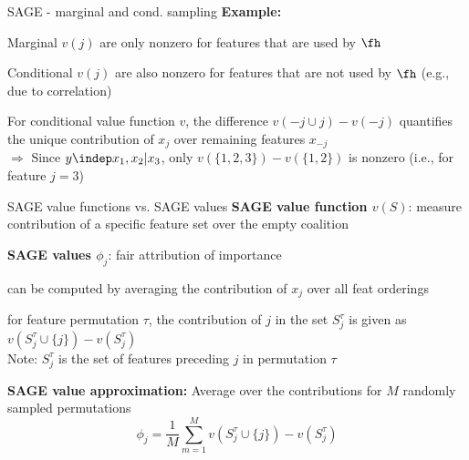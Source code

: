 \documentclass[10pt,compress,t,notes=noshow, xcolor=table]{beamer}
\newcommand{\Stau}{S_{j}^\tau}%
\newcommand{\Stauj}{\Stau \cup \{j\}}
\begin{document}
\begin{framev}[align=top]{SAGE - marginal and cond. sampling}
\textbf{Example:}
\spacer[0.25]
\begin{itemizeM}
\item Marginal $v(j)$ are only nonzero for features that are used by $\fh$
\item Conditional $v(j)$ are also nonzero for features that are not used by $\fh$ (e.g., due to correlation)
\item For conditional value function $v$, the difference $v(-j \cup j) - v(-j)$ quantifies the unique contribution of $x_j$ over remaining features $x_{-j}$\\
$\Rightarrow$ Since $y \indep x_1, x_2 | x_3$, only $v(\{1,2,3\}) - v(\{1, 2\})$ is nonzero (i.e., for feature $j = 3$)
\end{itemizeM}
\end{framev}


\begin{framev}[align=top]{SAGE value functions vs. SAGE values}
\textbf{SAGE value function $v(S)$}: measure contribution of a specific feature set over the empty coalition
\spacer[0.5]
\pause
 
\textbf{SAGE values $\phi_j$}: fair attribution of importance
\begin{itemizeM}
\item can be computed by averaging the contribution of $x_j$ over all feat orderings
\item for feature permutation $\tau$, the contribution of $j$ in the set $\Stau$ is given as $v(\Stauj) - v(\Stau)$\\
Note: $\Stau$ is the set of features preceding $j$ in permutation $\tau$
\end{itemizeM}
\spacer[0.5]
\pause

\textbf{SAGE value approximation:} Average over the contributions for $M$ randomly sampled permutations
$$
\phi_j = \frac{1}{M} \sum_{m=1}^M v(\Stauj) - v(\Stau)
$$
\end{framev}
\end{document}
